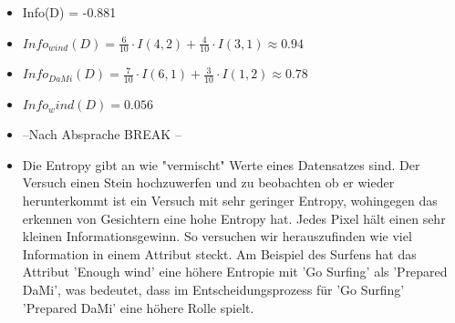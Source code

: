 \begin{itemize}
	\item Info(D) = -0.881

	\item $Info_{wind} (D) = \frac{6}{10} \cdot I(4,2) + \frac{4}{10} \cdot I(3,1) \approx 0.94$
	\item $Info_{DaMi} (D) = \frac{7}{10} \cdot I(6,1) + \frac{3}{10} \cdot I(1,2) \approx 0.78$

	\item $Info_wind (D) = 0.056$
	\item --Nach Absprache BREAK --

	\item Die Entropy gibt an wie "vermischt" Werte eines Datensatzes sind.
	 Der Versuch einen Stein hochzuwerfen und zu beobachten ob er wieder herunterkommt ist ein Versuch mit sehr geringer Entropy, wohingegen das erkennen von Gesichtern eine hohe Entropy hat. Jedes Pixel hält einen sehr kleinen Informationsgewinn. 
	So versuchen wir herauszufinden wie viel Information in einem Attribut steckt.
	Am Beispiel des Surfens hat das Attribut 'Enough wind' eine höhere Entropie mit 'Go Surfing' als 'Prepared DaMi', was bedeutet, dass im Entscheidungsprozess für 'Go Surfing' 'Prepared DaMi' eine höhere Rolle spielt.

\end{itemize}
